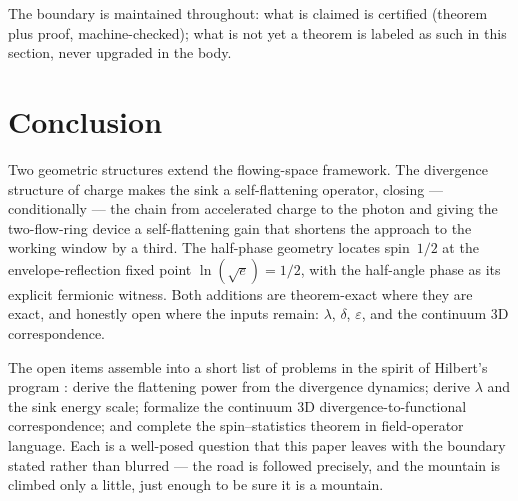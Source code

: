 \documentclass[aps,prd,preprint,superscriptaddress,amsmath,amssymb]{revtex4-2}
\begin{document}
The boundary is maintained throughout: what is claimed is certified
(theorem plus proof, machine-checked); what is not yet a theorem is
labeled as such in this section, never upgraded in the body.

\section{Conclusion}
\label{sec:conclusion}

Two geometric structures extend the flowing-space framework.  The
divergence structure of charge makes the sink a self-flattening
operator, closing --- conditionally --- the chain from accelerated
charge to the photon and giving the two-flow-ring device a
self-flattening gain that shortens the approach to the working window
by a third.  The half-phase geometry locates spin~$1/2$ at the
envelope-reflection fixed point $\ln(\sqrt e)=1/2$, with the
half-angle phase as its explicit fermionic witness.  Both additions
are theorem-exact where they are exact, and honestly open where the
inputs remain: $\lambda$, $\delta$, $\varepsilon$, and the continuum
3D correspondence.

The open items assemble into a short list of problems in the spirit of
Hilbert's program \cite{hilbert1900mathematische}: derive the
flattening power from the divergence dynamics; derive $\lambda$ and
the sink energy scale; formalize the continuum 3D
divergence-to-functional correspondence; and complete the
spin--statistics theorem in field-operator language.  Each is a
well-posed question that this paper leaves with the boundary stated
rather than blurred --- the road is followed precisely, and the
mountain is climbed only a little, just enough to be sure it is a
mountain.


\end{document}

